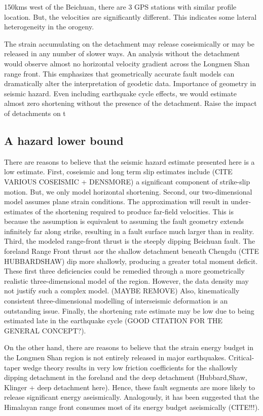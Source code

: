 \documentclass{article}
\begin{document}
150kms west of the Beichuan, there are 3 GPS stations with similar profile location. But, the velocities are significantly different. This indicates some lateral heterogeneity in the orogeny.

The strain accumulating on the detachment may release coseismically or may be released in any number of slower ways. 
An analysis without the detachment would observe almost no horizontal velocity gradient across the Longmen Shan range front. This emphasizes that geometrically accurate fault models can dramatically alter the interpretation of geodetic data. 
Importance of geometry in seismic hazard. Even including earthquake cycle effects, we would estimate almost zero shortening without the presence of the detachment. Raise the impact of detachments on t

\subsection{A hazard lower bound}
There are reasons to believe that the seismic hazard estimate presented here is a low estimate.
First, coseismic and long term slip estimates include (CITE VARIOUS COSEISMIC + DENSMORE) a significant component of strike-slip motion. But, we only model horizontal shortening. 
Second, our two-dimensional model assumes plane strain conditions. 
The approximation will result in under-estimates of the shortening required to produce far-field velocities.
This is because the assumption is equivalent to assuming the fault geometry extends infinitely far along strike, resulting in a fault surface much larger than in reality. 
Third, the modeled range-front thrust is the steeply dipping Beichuan fault. The foreland Range Front thrust aor the shallow detachment beneath Chengdu (CITE HUBBARDSHAW) dip more shallowly, producing a greater total moment deficit.
These first three deficiencies could be remedied through a more geometrically realistic three-dimensional model of the region. However, the data density may not justify such a complex model. 
(MAYBE REMOVE) Also, kinematically consistent three-dimensional modelling of interseismic deformation is an outstanding issue. 
Finally, the shortening rate estimate may be low due to being estimated late in the earthquake cycle (GOOD CITATION FOR THE GENERAL CONCEPT?). 

On the other hand, there are reasons to believe that the strain energy budget in the Longmen Shan region is not entirely released in major earthquakes. Critical-taper wedge theory results in very low friction coefficients for the shallowly dipping detachment in the foreland and the deep detachment (Hubbard,Shaw, Klinger + deep detachment here). Hence, these fault segments are more likely to release significant energy aseismically. Analogously, it has been suggested that the Himalayan range front consumes most of its energy budget aseismically (CITE!!!).
\end{document}
